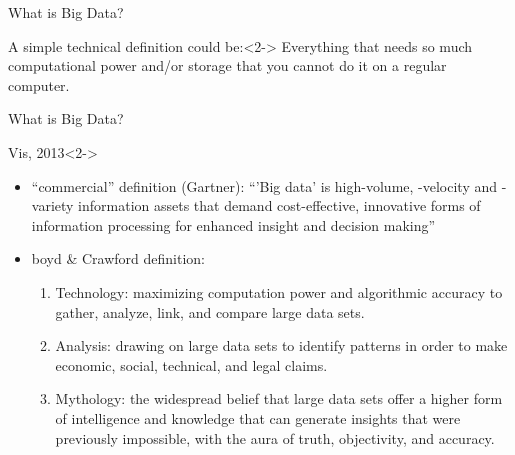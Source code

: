 \documentclass{beamer}
\begin{document}
{
	\begin{frame}[plain]
\end{frame}
}

\begin{frame}{What is Big Data?}
\begin{block}{A simple technical definition could be:}<2->
Everything that needs so much computational power and/or storage that you cannot do it on a regular computer.
\end{block}
\end{frame}

\begin{frame}{What is Big Data?}
\begin{block}{Vis, 2013}<2->
\begin{itemize}
\item<2,4> ``commercial'' definition (Gartner): ``'Big data' is high-volume, -velocity and -variety information assets that demand cost-effective, innovative forms of information processing for enhanced insight and decision making''
\item<3-> boyd \& Crawford definition: 
\begin{enumerate}
\item Technology: maximizing computation power and algorithmic accuracy to gather, analyze, link, and compare large data sets.
\item Analysis: drawing on large data sets to identify patterns in order to make economic, social, technical, and legal claims.
\item Mythology: the widespread belief that large data sets offer a higher form of intelligence and knowledge that can generate insights that were previously impossible, with the aura of truth, objectivity, and accuracy.
\end{enumerate}
\end{itemize}
\end{block}
\end{frame}
\end{document}

